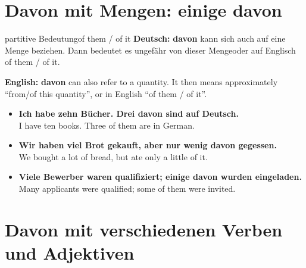 \documentclass[a4paper,11pt]{article}
\newcommand{\GermanText}[1]{\textbf{Deutsch: }#1\par}
\newcommand{\EnglishText}[1]{{\small\color{SoftGray}\textbf{English: }#1\par}}
\newcommand{\ExampleItem}[2]{\item \textbf{#1}\\{\small\color{SoftGray}#2}}
\begin{document}
    \section{Davon mit Mengen: \glqq einige davon\grqq}

        \begin{grammarentry}{partitive Bedeutung}{of them / of it}
            \GermanText{\textbf{davon} kann sich auch auf eine Menge beziehen. Dann bedeutet es ungefähr \glqq von dieser Menge\grqq oder auf Englisch \glqq of them / of it\grqq.}
            \EnglishText{\textbf{davon} can also refer to a quantity. It then means approximately ``from/of this quantity'', or in English ``of them / of it''.}
        \end{grammarentry}

        \begin{exbox}
            \begin{itemize}
                \ExampleItem{Ich habe zehn Bücher. Drei davon sind auf Deutsch.}{I have ten books. Three of them are in German.}
                \ExampleItem{Wir haben viel Brot gekauft, aber nur wenig davon gegessen.}{We bought a lot of bread, but ate only a little of it.}
                \ExampleItem{Viele Bewerber waren qualifiziert; einige davon wurden eingeladen.}{Many applicants were qualified; some of them were invited.}
            \end{itemize}
        \end{exbox}

    \section{Davon mit verschiedenen Verben und Adjektiven}
\end{document}
